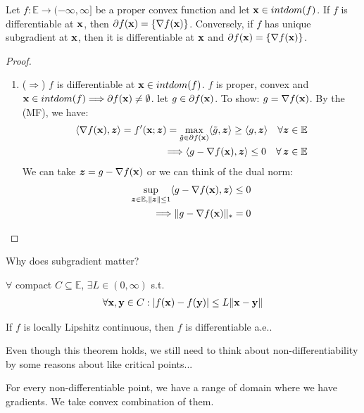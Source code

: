 \documentclass[11pt]{article}
\begin{document}
\begin{theorem}
    Let $f: \mathbb{E} \to (-\infty, \infty]$ be a proper convex function and let 
    ${\mathbf{x}} \in intdom(f)$. If $f$ is differentiable at ${\mathbf{x}}$, then $\partial f({\mathbf{x}}) = \{ \nabla f({\mathbf{x}}) \}$.
    Conversely, if $f$ has unique subgradient at ${\mathbf{x}}$, then it is differentiable at ${\mathbf{x}}$ and 
    $\partial f({\mathbf{x}}) = \{ \nabla f({\mathbf{x}}) \}$.
\end{theorem}
\begin{proof}
    \begin{enumerate}
        \item ($\Longrightarrow$) 
        $f$ is differentiable at ${\mathbf{x}} \in intdom(f)$. $f$ is proper, convex and ${\mathbf{x}} \in intdom(f)
        \Longrightarrow \partial f({\mathbf{x}}) \neq \emptyset$. let $g \in \partial f({\mathbf{x}})$. To show:
        $g = \nabla f({\mathbf{x}})$. By the (MF), we have:
        \begin{align*}
            \langle \nabla f({\mathbf{x}}), {\bm{z}} \rangle = 
                f'({\mathbf{x}}; {\bm{z}}) = \max_{\tilde{g} \in \partial f({\mathbf{x}})}\langle \tilde{g}, {\bm{z}} \rangle
                \ge \langle g, {\bm{z}} \rangle \quad \forall  {\bm{z}} \in \mathbb{E}\\
            \Longrightarrow \langle g - \nabla f({\mathbf{x}}), {\bm{z}} \rangle \le 0 \quad \forall \, {\bm{z}} \in \mathbb{E}
        \end{align*}
        We can take ${\bm{z}} = g - \nabla f({\mathbf{x}})$ or we can think of the dual norm:
        \begin{align*}
            \sup_{{\bm{z}} \in \mathbb{E}, \| {\bm{z}} \|\le 1 }\langle g - \nabla f({\mathbf{x}}), {\bm{z}} \rangle \le 0\\
            \Longrightarrow \| g - \nabla f({\mathbf{x}}) \| _{*} = 0
        \end{align*}
    \end{enumerate}
\end{proof}

Why does subgradient matter?
\begin{definition}
    $\forall $ compact $C \subseteq \mathbb{E}$, $\exists L \in (0,\infty)$ s.t.
    \begin{align*}
        \forall {\mathbf{x}}, {\mathbf{y}} \in C: |f({\mathbf{x}}) - f({\mathbf{y}})| \le L\| {\mathbf{x}} - {\mathbf{y}} \| 
    \end{align*}
\end{definition}
\begin{theorem}
    If $f$ is locally Lipshitz continuous, then $f$ is differentiable a.e..
\end{theorem}
Even though this theorem holds, we still need to think about non-differentiability by some reasons 
about like critical points...
\begin{definition}
    
\end{definition}
For every non-differentiable point, we have a range of domain where we have gradients. We take 
convex combination of them.
\end{document}

